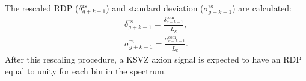 The rescaled RDP ($\delta^\text{rs}_{g+k-1}$) and
standard deviation ($\sigma^\text{rs}_{g+k-1}$) are calculated:
\begin{equation}
  \label{eq:rescaled_delta_sigma_com}
  \begin{split}
  \delta^\text{rs}_{g+k-1} = \frac{\delta^\text{com}_{g+k-1}}{\bar{L}_{k}},\\
  \sigma^\text{rs}_{g+k-1} = \frac{\sigma^\text{com}_{g+k-1}}{\bar{L}_{k}}.
  \end{split}
\end{equation}
After this rescaling 
procedure, a KSVZ axion signal is expected to have an RDP equal to unity for 
each bin in the spectrum. 




